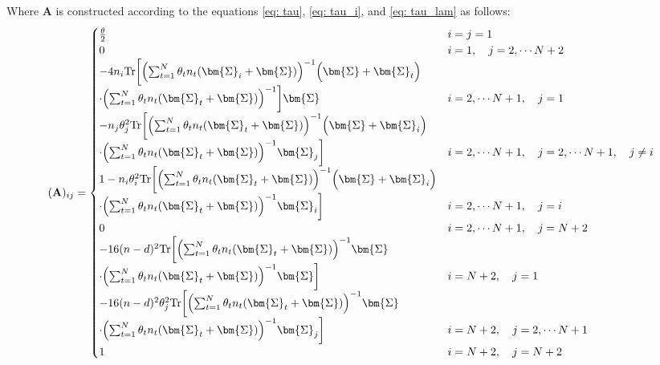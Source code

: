 \documentclass[final]{l4dc2026}
\newcommand{\bSigma}{\bm{\Sigma}}
\newcommand{\bA}{\mathbf{A}}
\newcommand{\tr}{\text{Tr}}
\begin{document}
Where $\bA$ is constructed according to the equations \eqref{eq: tau}, \eqref{eq: tau_i}, and \eqref{eq: tau_lam} as follows:
\begin{align}\label{eq: A_def}
    (\bA)_{ij} = \begin{cases}
        \frac{\theta}{2}  & i = j = 1 \\
        0 & i = 1, \quad j = 2,\cdots N + 2 \\
        -  4 n_i  \tr \biggl[ \Bigl(\sum_{t=1}^N \theta_t n_t (\bSigma_i + \bSigma) \Bigr)^{-1} \Bigl(\bSigma + \bSigma_t \Bigr) & \\ \cdot \Bigl(\sum_{t=1}^N \theta_t n_t (\bSigma_t + \bSigma)\Bigr)^{-1}\biggr]  \bSigma & i = 2,\cdots N+1, \quad j = 1 \\
         -n_j \theta^2_j \tr \biggl[\Bigl(\sum_{t=1}^N \theta_t n_t (\bSigma_t + \bSigma) \Bigr)^{-1} \Bigl(\bSigma + \bSigma_i \Bigr)   & \\
         \cdot \Bigl(\sum_{t=1}^N \theta_t n_t (\bSigma_t + \bSigma)\Bigr)^{-1}  \bSigma_j \biggr] & i = 2, \cdots N+1, \quad j = 2, \cdots N+1, \quad j \neq i \\ 
         1- n_i \theta^2_i \tr \biggl[\Bigl(\sum_{t=1}^N \theta_t n_t (\bSigma_t + \bSigma) \Bigr)^{-1} \Bigl(\bSigma + \bSigma_i \Bigr)  & \\
         \cdot \Bigl(\sum_{t=1}^N \theta_t n_t (\bSigma_t + \bSigma)\Bigr)^{-1}  \bSigma_i \biggr] & i = 2, \cdots N+1, \quad j = i \\
         0 & i = 2,\cdots N+1, \quad j = N+2 \\
         - 16(n-d)^2 \tr \biggl[ \Bigl(\sum_{t=1}^N \theta_t n_t (\bSigma_t + \bSigma) \Bigr)^{-1} \bSigma & \\
         \cdot \Bigl(\sum_{t=1}^N \theta_t n_t (\bSigma_t + \bSigma) \Bigr)^{-1} \bSigma \biggr] & i = N+2, \quad j = 1 \\
         - 16(n-d)^2\theta_j^2 \tr \biggl[\Bigl(\sum_{t=1}^N \theta_t n_t(\bSigma_t + \bSigma) \Bigr)^{-1} \bSigma & \\ \cdot \Bigl(\sum_{t=1}^N \theta_t n_t (\bSigma_t + \bSigma) \Bigr)^{-1} \bSigma_j \biggr] & i = N+2, \quad j = 2, \cdots N+1 \\
         1 & i = N+2, \quad j = N+2
    \end{cases}
\end{align}
\end{document}

